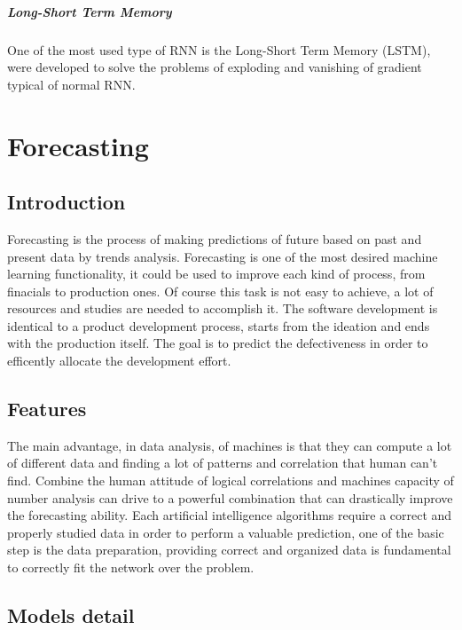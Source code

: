 \documentclass[%
    corpo=12pt,
    twoside,
    oldstyle,
    autoretitolo,
    greek,
    evenboxes,
]{toptesi}
\begin{document}
\paragraph{Long-Short Term Memory}
One of the most used type of RNN is the Long-Short Term Memory (LSTM), were developed to solve the problems of exploding and vanishing of gradient typical of normal RNN.



\chapter{Forecasting}
\section{Introduction}
Forecasting is the process of making predictions of future based on past and present data by trends analysis. Forecasting is one of the most desired machine learning functionality, it could be used to improve each kind of process, from finacials to production ones. Of course this task is not easy to achieve, a lot of resources and studies are needed to accomplish it.
The software development is identical to a product development process, starts from the ideation and ends with the production itself.
The goal is to predict the defectiveness in order to efficently allocate the development effort.

\section{Features}
The main advantage, in data analysis, of machines is that they can compute a lot of different data and finding a lot of patterns and correlation that human can't find. Combine the human attitude of logical correlations and machines capacity of number analysis can drive to a powerful combination that can drastically improve the forecasting ability.
Each artificial intelligence algorithms require a correct and properly studied data in order to perform a valuable prediction, one of the basic step is the data preparation, providing correct and organized data is fundamental to correctly fit the network over the problem.

\section{Models detail}
\end{document}
